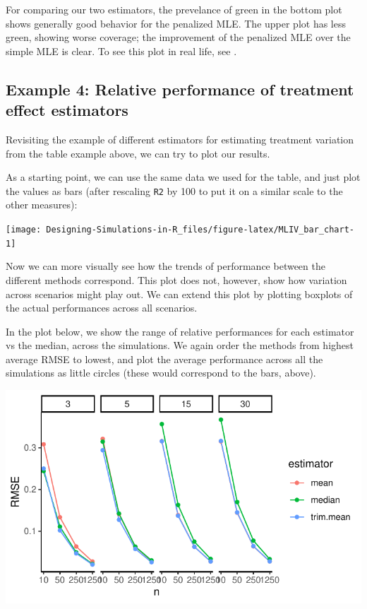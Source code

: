 \documentclass[
]{book}
\begin{document}
For comparing our two estimators, the prevelance of green in the bottom plot shows generally good behavior for the penalized MLE. The upper plot has less green, showing worse coverage; the improvement of the penalized MLE over the simple MLE is clear.
To see this plot in real life, see \citet{pustejovsky2015four}.

\subsection{Example 4: Relative performance of treatment effect estimators}\label{example-4-relative-performance-of-treatment-effect-estimators}

Revisiting the example of different estimators for estimating treatment variation from the table example above, we can try to plot our results.

As a starting point, we can use the same data we used for the table, and just plot the values as bars (after rescaling \texttt{R2} by 100 to put it on a similar scale to the other measures):

\begin{center}\texttt{[image: Designing-Simulations-in-R\_files/figure-latex/MLIV\_bar\_chart-1]} \end{center}

Now we can more visually see how the trends of performance between the different methods correspond.
This plot does not, however, show how variation across scenarios might play out.
We can extend this plot by plotting boxplots of the actual performances across all scenarios.

In the plot below, we show the range of relative performances for each estimator vs the median, across the simulations.
We again order the methods from highest average RMSE to lowest, and plot the average performance across all the simulations as little circles (these would correspond to the bars, above).

\begin{center}\includegraphics[width=0.75\linewidth]{Designing-Simulations-in-R_files/figure-latex/unnamed-chunk-168-1} \end{center}
\end{document}
